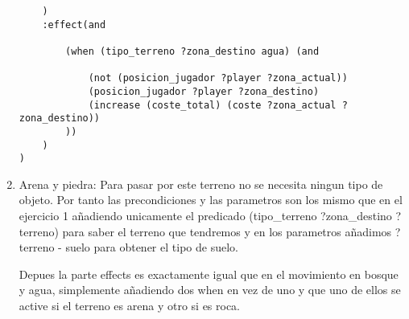 \documentclass[]{article}
\begin{document}
\begin{enumerate}
\begin{lstlisting}
	)
	:effect(and 
		
		(when (tipo_terreno ?zona_destino agua) (and 
		
			(not (posicion_jugador ?player ?zona_actual))
			(posicion_jugador ?player ?zona_destino)
			(increase (coste_total) (coste ?zona_actual ?zona_destino))
		))
	)
)

\end{lstlisting}

\item{Arena y piedra:} Para pasar por este terreno no se necesita ningun tipo de objeto. Por tanto las precondiciones y las parametros son los mismo que en el ejercicio 1 añadiendo unicamente el predicado (tipo\_terreno ?zona\_destino ?terreno) para saber el terreno que tendremos y en los parametros añadimos ?terreno - suelo para obtener el tipo de suelo. 

Depues la parte effects es exactamente igual que en el movimiento en bosque y agua, simplemente añadiendo dos when en vez de uno y que uno de ellos se active si el terreno es arena y otro si es roca. 

\end{enumerate}
	
	\begin{lstlisting}
	
	\end{lstlisting}
	
\end{document}
